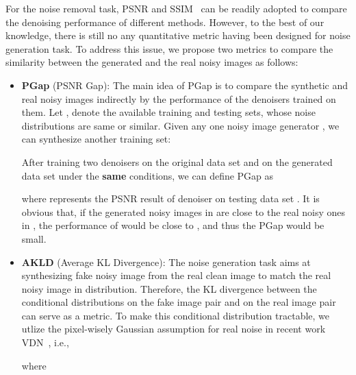 \documentclass[runningheads]{llncs}
\newenvironment{shrinkeq}[2]
{ \bgroup
  \addtolength\abovedisplayshortskip{#1}
  \addtolength\abovedisplayskip{#1}
  \addtolength\belowdisplayshortskip{#2}
  \addtolength\belowdisplayskip{#2}}
{\egroup\ignorespacesafterend}
\begin{document}
For the noise removal task, PSNR and SSIM~\cite{wang2004image} can be readily adopted to compare the denoising
performance of different methods.
However, to the best of our knowledge, there is still no any quantitative metric having been designed for noise
generation task.
To address this issue, we propose two metrics to compare the similarity between
the generated and the real noisy images as follows:
\begin{itemize}
    \item \textbf{PGap} (PSNR Gap): The main idea of PGap is to compare the synthetic and real noisy images indirectly
        by the performance of the denoisers trained on them. Let ,
         denote the available training and testing sets, whose
        noise distributions are same or similar. Given any one noisy image generator , we can 
        synthesize another training set:
        \begin{small}

\end{small}
\hspace{-1mm}After training two denoisers  on the original
        data set  and 
         on the generated data set  under the \textbf{same }conditions, we can define PGap as
        \begin{small}

\end{small}
        \hspace{-1mm}where  represents the PSNR result of denoiser  on
        testing data set . It is obvious that, if the generated noisy images in 
        are close to the real noisy ones in , the performance of  would be close to
        , and thus the PGap would be small.
        \vspace{2mm}
    \item \textbf{AKLD} (Average KL  Divergence): The noise generation task aims at synthesizing fake noisy image
         from the real clean image  to match the real noisy image  in distribution.
        Therefore, the KL divergence between the conditional distributions  on the fake
        image pair  and  on the real image pair 
        can serve as a metric. To make this conditional distribution tractable, we utlize the pixel-wisely Gaussian
        assumption for real noise in recent work VDN~\cite{yue2019variational}, i.e.,
        \begin{small}
        \begin{shrinkeq}{-1mm}{-1mm}
        
        \end{shrinkeq}
        \end{small}
        \hspace{-1mm}where
        \begin{small}
        

\end{small}
\end{itemize}
\end{document}
